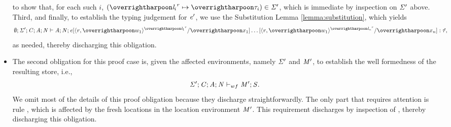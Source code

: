 \begin{nproof}
\begin{bcase}
\begin{itemize}
    to show that, for each such $i$, $(\locreg{\overharpoon{\loc_i}}{\reg} \mapsto \overharpoon{\TYP_i}) \in \SENV'$,
    which is immediate by inspection on $\mathit{\Sigma}'$ above.
    Third, and finally, to establish the typing judgement for $\mathit{e}'$, we use the Substitution
    Lemma \ref{lemma:substitution}, which yields
    \begin{align*}
    \emptyset;\SENV';\CENV;\AENV;\NENV \vdash \AENV;\NENV; \subst{\EXPR}{\overharpoon{\var_1}}{\concreteloc{\reg}{\overharpoon{w_1}}{\overharpoon{\locreg{\loc_1}{\reg}}}}
    \ldots \subst{}{\overharpoon{\var_n}}{\concreteloc{\reg}{\overharpoon{w_1}}{\overharpoon{\locreg{\loc_n}{\reg}}}}: \hTYP,
    \end{align*}
    as needed, thereby discharging this obligation.
    \item The second obligation
    for this proof case is, given the affected environments, namely
    $\mathit{\Sigma}'$ and $\mathit{M}'$, to establish the well formedness
    of the resulting store, i.e.,
    \begin{displaymath}
    \mathit{\Sigma}';\mathit{C};\mathit{A};\mathit{N} \vdash_{wf} \mathit{M}';\mathit{S}.
    \end{displaymath}
    We omit most of the details of this proof obligation because they
    discharge straightforwardly.
    The only part that requires attention is rule
    ,
    which is affected by the fresh locations in the location
    environment $\mathit{M}'$.
    This requirement discharges by inspection of \dcase{}, thereby
    discharging this obligation.
    \end{itemize}
  \end{bcase}


\end{nproof}
